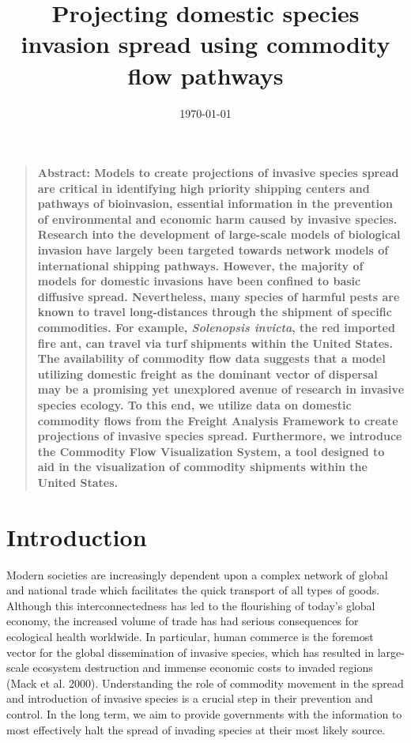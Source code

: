 \documentclass[12pt]{article}
\title{Projecting domestic species invasion spread using commodity flow pathways}
\author
{Ashish Gauli,$^{1,2}$ Nathan Wikle,$^{1,3}$ Ryan Yan,$^{1,4}$\\ 
Dr. Louis Gross,$^{1,5}$ Dr. Daniel Simberloff,$^{5}$ Angela Chuang,$^{5}$ Cedric Landerer$^{5}$\\
\\
\normalsize{$^{1}$National Institute for Mathematical and Biological Synthesis (NIMBioS)}\\
\normalsize{$^{2}$Biology and Computer Science, Fisk University}\\
\normalsize{$^{3}$Mathematics, Truman State University}\\
\normalsize{$^{4}$Mathematical Biology, College of William and Mary}\\
\normalsize{$^{5}$Ecology and Evolutionary Biology, University of Tennessee}\\
\\
}
\date{\today}
\newenvironment{sciabstract}{%
\begin{quote} \bf}
{\end{quote}}
\begin{document}
 


\baselineskip24pt


\maketitle 


 \begin{sciabstract}
Abstract: Models to create projections of invasive species spread are critical in identifying high priority shipping centers and pathways of bioinvasion, essential information in the prevention of environmental and economic harm caused by invasive species.  Research into the development of large-scale models of biological invasion have largely been targeted towards network models of international shipping pathways. However, the majority of models for domestic invasions have been confined to basic diffusive spread. Nevertheless, many species of harmful pests are known to travel long-distances through the shipment of specific commodities.  For example, \textit{Solenopsis invicta}, the red imported fire ant, can travel via turf shipments within the United States. The availability of commodity flow data suggests that a model utilizing domestic freight as the dominant vector of dispersal may be a promising yet unexplored avenue of research in invasive species ecology. To this end, we utilize data on domestic commodity flows from the Freight Analysis Framework to create projections of invasive species spread. Furthermore, we introduce the Commodity Flow Visualization System, a tool designed to aid in the visualization of commodity shipments within the United States.
\end{sciabstract}



\section*{Introduction}

Modern societies are increasingly dependent upon a complex network of global and national trade which facilitates the quick transport of all types of goods.  Although this interconnectedness has led to the flourishing of today's global economy, the increased volume of trade has had serious consequences for ecological health worldwide.  In particular, human commerce is the foremost vector for the global dissemination of invasive species, which has resulted in large-scale ecosystem destruction and immense economic costs to invaded regions (Mack et al. 2000).  Understanding the role of commodity movement in the spread and introduction of invasive species is a crucial step in their prevention and control.  In the long term, we aim to provide governments with the information to most effectively halt the spread of invading species at their most likely source.
\end{document}
